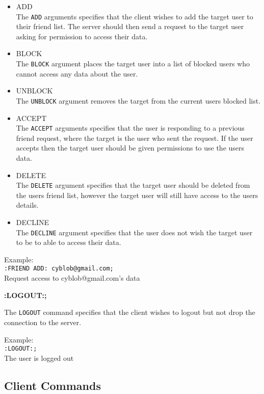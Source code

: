 \begin{itemize}

\item{ADD \\
The \texttt{ADD} arguments specifies that the client wishes to add the target user to their friend list. The server should then send a request to the target user asking for permission to access their data.}

\item{BLOCK \\
The \texttt{BLOCK} argument places the target user into a list of blocked users who cannot access any data about the user.}

\item{UNBLOCK \\
The \texttt{UNBLOCK} argument removes the target from the current users blocked list.}

\item{ACCEPT \\
The \texttt{ACCEPT} arguments specifies that the user is responding to a previous friend request, where the target is the user who sent the request. If the user accepts then the target user should be given permissions to use the users data.}

\item{DELETE \\
The \texttt{DELETE}  argument specifies that the target user should be deleted from the users friend list, however the target user will still have access to the users details.}

\item{DECLINE \\
The \texttt{DECLINE} argument specifies that the user does not wish the target user to be to able to access their data.}

\end{itemize}

Example: \\
\texttt{:FRIEND ADD: cyblob@gmail.com;}	\\
Request access to cyblob@gmail.com’s data

{\bf :LOGOUT:;}

The \texttt{LOGOUT} command specifies that the client wishes to logout but not drop the connection to the server.

Example: \\
\texttt{:LOGOUT:;}\\
The user is logged out

\subsection*{Client Commands}

